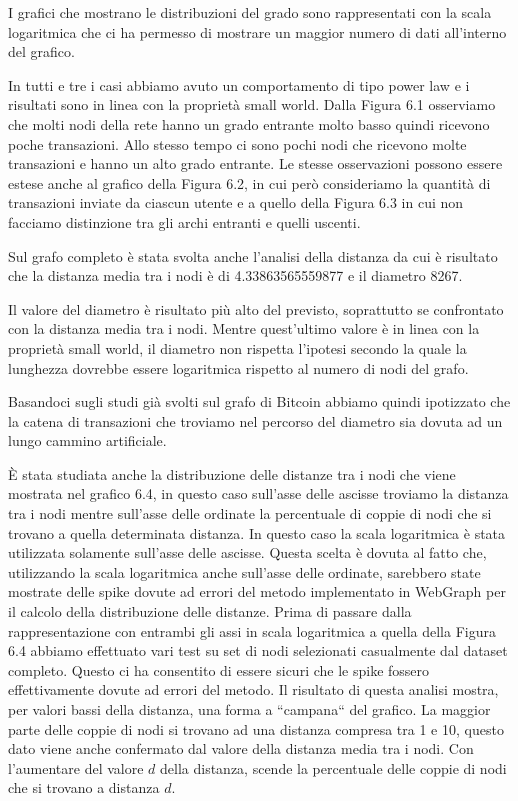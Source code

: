 \documentclass[12pt]{report}
\begin{document}
I grafici che mostrano le distribuzioni del grado sono rappresentati con la scala logaritmica che ci ha permesso di mostrare un maggior numero di dati all'interno del grafico.

In tutti e tre i casi abbiamo avuto un comportamento di tipo power law e i risultati sono in linea con la proprietà small world.
Dalla Figura 6.1 osserviamo che molti nodi della rete hanno un grado entrante molto basso quindi ricevono poche transazioni. Allo stesso tempo ci sono pochi nodi che ricevono molte transazioni e hanno un alto grado entrante.
Le stesse osservazioni possono essere estese anche al grafico della Figura 6.2, in cui però consideriamo la quantità di transazioni inviate da ciascun utente e a quello della Figura 6.3 in cui non facciamo distinzione tra gli archi entranti e quelli uscenti.

Sul grafo completo è stata svolta anche l'analisi della distanza da cui è risultato che la distanza media tra i nodi è di 4.33863565559877 e il diametro 8267.

Il valore del diametro è risultato più alto del previsto, soprattutto se confrontato con la distanza media tra i nodi. Mentre quest'ultimo valore è in linea con la proprietà small world, il diametro non rispetta l'ipotesi secondo la quale la lunghezza dovrebbe essere logaritmica rispetto al numero di nodi del grafo.

Basandoci sugli studi già svolti sul grafo di Bitcoin \cite{maesa2017detecting} abbiamo quindi ipotizzato che la catena di transazioni che troviamo nel percorso del diametro sia dovuta ad un lungo cammino artificiale.

È stata studiata anche la distribuzione delle distanze tra i nodi che viene mostrata nel grafico 6.4, in questo caso sull'asse delle ascisse troviamo la distanza tra i nodi mentre sull'asse delle ordinate la percentuale di coppie di nodi che si trovano a quella determinata distanza.
In questo caso la scala logaritmica è stata utilizzata solamente sull'asse delle ascisse. 
Questa scelta è dovuta al fatto che, utilizzando la scala logaritmica anche sull'asse delle ordinate, sarebbero state mostrate delle spike dovute ad errori del metodo implementato in WebGraph per il calcolo della distribuzione delle distanze.
Prima di passare dalla rappresentazione con entrambi gli assi in scala logaritmica a quella della Figura 6.4 abbiamo effettuato vari test su set di nodi selezionati casualmente dal dataset completo. 
Questo ci ha consentito di essere sicuri che le spike fossero effettivamente dovute ad errori del metodo.
Il risultato di questa analisi mostra, per valori bassi della distanza, una forma a ``campana`` del grafico. La maggior parte delle coppie di nodi si trovano ad una distanza compresa tra 1 e 10, questo dato viene anche confermato dal valore della distanza media tra i nodi. 
Con l'aumentare del valore $d$ della distanza, scende la percentuale delle coppie di nodi che si trovano a distanza $d$.
\end{document}
